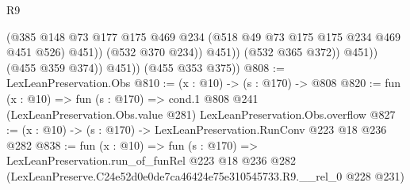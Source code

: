 \begin{lexlean}{R9}
\begin{coremodule}
                          (@385
                            @148
                            @73
                            @177
                            @175
                            @469
                            @234
                            (@518 @49 @73 @175 @175 @234 @469 @451 @526)
                            @451))
                        (@532 @370 @234))
                      @451))
                  (@532 @365 @372))
                @451))
            (@455 @359 @374))
          @451))
      (@455 @353 @375))
@808 := LexLeanPreservation.Obs
@810 := (x : @10) -> (s : @170) -> @808
@820 := fun (x : @10) =>
  fun (s : @170) =>
  cond.{1} @808 @241 (LexLeanPreservation.Obs.value @281) LexLeanPreservation.Obs.overflow
@827 := (x : @10) -> (s : @170) -> LexLeanPreservation.RunConv @223 @18 @236 @282
@838 := fun (x : @10) =>
  fun (s : @170) =>
  LexLeanPreservation.run_of_funRel
    @223
    @18
    @236
    @282
    (LexLeanPreserve.C24e52d0e0de7ca46424e75e310545733.R9.__rel_0 @228 @231)
\end{coremodule}
\end{lexlean}
